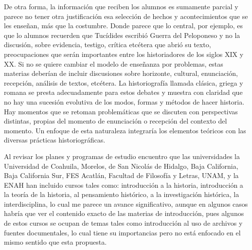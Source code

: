 De otra forma, la información que reciben los alumnos es sumamente 
parcial y parece no tener otra justificación esa selección de hechos y 
acontecimientos que se les enseñan, más que la costumbre. Donde parece 
que lo central, por ejemplo, es que lo alumnos recuerden que Tucídides 
escribió Guerra del Peloponeso y no la discusión, sobre evidencia, 
testigo, crítica etcétera que abrió su texto, preocupaciones que serán 
importantes entre los historiadores de los siglos XIX y XX. Si no se 
quiere cambiar el modelo de enseñanza por problemas, estas materias 
deberían de incluir discusiones sobre horizonte, cultural, enunciación, 
recepción, análisis de textos, etcétera. La historiografía llamada 
clásica, griega y romana se presta adecuadamente para estos debates y 
muestra con claridad que no hay una sucesión evolutiva de los modos, 
formas y métodos de hacer historia. Hay momentos que se retoman 
problemáticas que se discuten con perspectivas distintas, propias del 
momento de enunciación o recepción del contexto del momento. Un enfoque 
de esta naturaleza integraría los elementos teóricos con las diversas 
prácticas historiográficas. 

Al revisar los planes y programas de estudio encuentro que las universidades
la Universidad de Coahuila, Morelos, de San Nicolás de Hidalgo, Baja
California, Baja California Sur, FES Acatlán, Facultad de Filosofía y
Letras, UNAM, y la ENAH han incluido cursos tales como: introducción a la
historia, introducción a la teoría de la historia, al pensamiento
histórico, a la investigación histórica, la interdisciplina, lo cual me
parece un avance significativo, aunque en algunos casos habría que ver el
contenido exacto de las materias de introducción, pues algunos de estos
cursos se ocupan de temas tales como introducción al uso de archivos y
fuentes documentales, lo cual tiene su importancias pero no está enfocado
en el mismo sentido que esta propuesta. 

